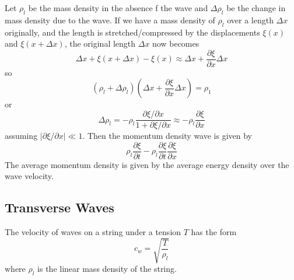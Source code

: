 \documentclass[12pt, a4paper, oneside, openright, titlepage]{book}
\begin{document}
Let $\rho_l$ be the mass density in the absence f the wave and $\Delta \rho_l$ be the change in mass density due to the wave. If we have a mass density of $\rho_l$ over a length $\Delta x$ originally, and the length is stretched/compressed by the displacements $\xi(x)$ and $\xi(x+\Delta x)$, the original length $\Delta x$ now becomes
\begin{equation*}
    \Delta x+\xi(x+\Delta x)-\xi(x) \approx \Delta x+\frac{\partial\xi}{\partial x}\Delta x
\end{equation*}
so
\begin{equation*}
    (\rho_l+\Delta \rho_l)\left(\Delta x+\frac{\partial \xi}{\partial x}\Delta x\right) = \rho_1
\end{equation*}
or
\begin{equation*}
    \Delta \rho_l = -\rho_l\frac{\partial\xi/\partial x}{1+\partial \xi/\partial x} \approx -\rho_l\frac{\partial\xi}{\partial x}
\end{equation*}
assuming $|\partial\xi/\partial x|\ll 1$. Then the momentum density wave is given by
\begin{equation*}
    \rho_l\frac{\partial\xi}{\partial t}-\rho_l\frac{\partial \xi}{\partial t}\frac{\partial \xi}{\partial x}
\end{equation*}
The average momentum density is given by the average energy density over the wave velocity. 



\subsection{Transverse Waves}


The velocity of waves on a string under a tension $T$ has the form
\begin{equation*}
    c_w = \sqrt{\frac{T}{\rho_l}}
\end{equation*}
where $\rho_l$ is the linear mass density of the string.
\end{document}

